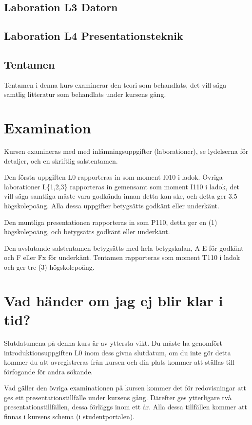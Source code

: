 \documentclass[a4paper,logo]{miunart}
\begin{document}
\subsection{Laboration L3 Datorn}


\subsection{Laboration L4 Presentationsteknik}


\subsection{Tentamen}
Tentamen i denna kurs examinerar den teori som behandlats, det vill säga 
samtlig litteratur som behandlats under kursens gång.


\section{Examination}
\label{sec:exam}
Kursen examineras med med inlämningsuppgifter (laborationer), se lydelserna för 
detaljer, och en skriftlig salstentamen.

Den första uppgiften L0 rapporteras in som moment I010 i ladok.
Övriga laborationer L\{1,2,3\} rapporteras in gemensamt som moment I110 
i ladok, det vill säga samtliga måste vara godkända innan detta kan ske, och 
detta ger 3.5 högskolepoäng.
Alla dessa uppgifter betygsätts godkänt eller underkänt.

Den muntliga presentationen rapporteras in som P110, detta ger en (1) 
högskolepoäng, och betygsätts godkänt eller underkänt.

Den avslutande salstentamen betygsätts med hela betygskalan, A-E för godkänt 
och F eller Fx för underkänt.
Tentamen rapporteras som moment T110 i ladok och ger tre (3) högskolepoäng.


\section{Vad händer om jag ej blir klar i tid?}
\label{sec:late}
Slutdatumena på denna kurs är av yttersta vikt.
Du måste ha genomfört introduktionsuppgiften L0 inom dess givna slutdatum, om 
du inte gör detta kommer du att avregistreras från kursen och din plats kommer 
att ställas till förfogande för andra sökande.

Vad gäller den övriga examinationen på kursen kommer det för redovisningar att 
ges ett presentationstillfälle under kursens gång.
Därefter ges ytterligare två presentationstillfällen, dessa förläggs inom ett 
år.
Alla dessa tillfällen kommer att finnas i kursens schema (i studentportalen).
\end{document}
